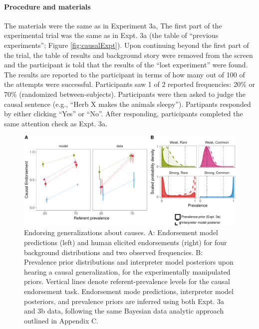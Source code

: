 \documentclass[english,floatsintext,man]{apa6}
\theoremstyle{definition}
\theoremstyle{definition}
\theoremstyle{definition}
\theoremstyle{remark}
\begin{document}
\paragraph{Procedure and materials}\label{procedure-and-materials-2}

The materials were the same as in Experiment 3a, The first part of the
experimental trial was the same as in Expt. 3a (the table of
\enquote{previous experiments}; Figure \ref{fig:causalExpt}). Upon
continuing beyond the first part of the trial, the table of results and
background story were removed from the screen and the participant is
told that the results of the \enquote{lost experiment} were found. The
results are reported to the participant in terms of how many out of 100
of the attempts were successful. Participants saw 1 of 2 reported
frequencies: 20\% or 70\% (randomized between-subjects). Participants
were then asked to judge the causal sentence (e.g., \enquote{Herb X
makes the animals sleepy}). Partipants responded by either clicking
\enquote{Yes} or \enquote{No}. After responding, participants completed
the same attention check as Expt. 3a.

\begin{figure}[htbp]
\centering
\includegraphics{figs/figure-causals-1.pdf}
\caption{\label{fig:figure-causals}Endorsing generalizations about causes.
A: Endorsement model predictions (left) and human elicited endorsements
(right) for four background distributions and two observed frequencies.
B: Prevalence prior distributions and interpreter model posteriors upon
hearing a causal generalization, for the experimentally manipulated
priors. Vertical lines denote referent-prevalence levels for the causal
endorsement task. Endorsement mode predictions, interpreter model
posteriors, and prevalence priors are inferred using both Expt. 3a and
3b data, following the same Bayesian data analytic approach outlined in
Appendix C.}
\end{figure}
\end{document}
